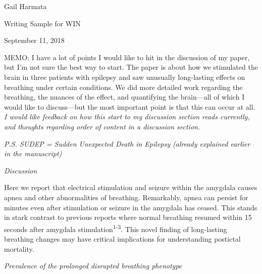 \documentclass[]{article}
\date{}
\begin{document}
Gail Harmata

Writing Sample for WIN

September 11, 2018

MEMO: I have a lot of points I would like to hit in the discussion of my
paper, but I'm not sure the best way to start. The paper is about how we
stimulated the brain in three patients with epilepsy and saw unusually
long-lasting effects on breathing under certain conditions. We did more
detailed work regarding the breathing, the nuances of the effect, and
quantifying the brain---all of which I would like to discuss---but the
most important point is that this can occur at all. \emph{\emph{I would
like feedback on how this start to my discussion section reads
currently, and thoughts regarding order of content in a discussion
section. }}

\emph{P.S. SUDEP = Sudden Unexpected Death in Epilepsy (already
explained earlier in the manuscript)}

\emph{Discussion}

Here we report that electrical stimulation and seizure within the
amygdala causes apnea and other abnormalities of breathing.
Remarkably, apnea can persist for minutes even after
stimulation or seizure in the amygdala has ceased. 
This stands in stark contrast to previous reports where normal breathing
resumed within 15 seconds after amygdala stimulation\textsuperscript{1-3}. This
novel finding of long-lasting breathing changes may have critical
implications for understanding postictal mortality.

\emph{Prevalence of the prolonged disrupted breathing phenotype}
\end{document}
